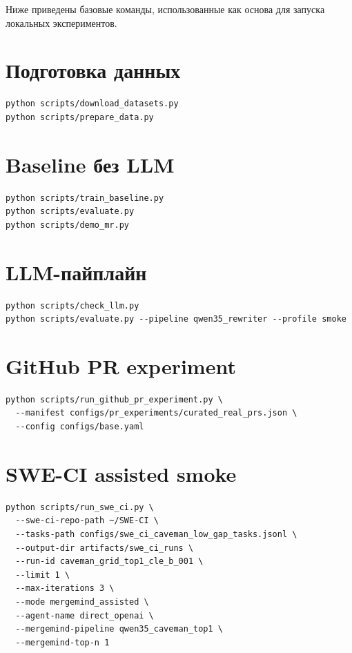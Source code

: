 \documentclass[14pt,a4paper]{extreport}
\begin{document}
Ниже приведены базовые команды, использованные как основа для запуска
локальных экспериментов.

\section*{Подготовка данных}

\begin{verbatim}
python scripts/download_datasets.py
python scripts/prepare_data.py
\end{verbatim}

\section*{Baseline без LLM}

\begin{verbatim}
python scripts/train_baseline.py
python scripts/evaluate.py
python scripts/demo_mr.py
\end{verbatim}

\section*{LLM-пайплайн}

\begin{verbatim}
python scripts/check_llm.py
python scripts/evaluate.py --pipeline qwen35_rewriter --profile smoke
\end{verbatim}

\section*{GitHub PR experiment}

\begin{verbatim}
python scripts/run_github_pr_experiment.py \
  --manifest configs/pr_experiments/curated_real_prs.json \
  --config configs/base.yaml
\end{verbatim}

\section*{SWE-CI assisted smoke}

\begin{verbatim}
python scripts/run_swe_ci.py \
  --swe-ci-repo-path ~/SWE-CI \
  --tasks-path configs/swe_ci_caveman_low_gap_tasks.jsonl \
  --output-dir artifacts/swe_ci_runs \
  --run-id caveman_grid_top1_cle_b_001 \
  --limit 1 \
  --max-iterations 3 \
  --mode mergemind_assisted \
  --agent-name direct_openai \
  --mergemind-pipeline qwen35_caveman_top1 \
  --mergemind-top-n 1
\end{verbatim}
\end{document}

